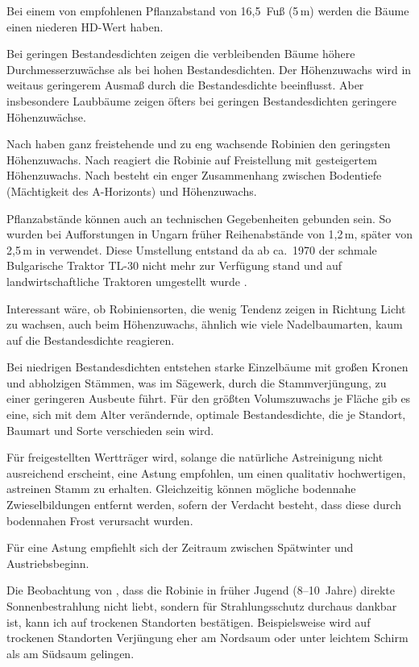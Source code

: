 \documentclass[twocolumn]{scrartcl}
\begin{document}
Bei einem von \cite{jessup1791robinie} empfohlenen Pflanzabstand von
16,5~Fuß (5\,m) werden die Bäume einen niederen HD-Wert haben.

Bei geringen Bestandesdichten zeigen die verbleibenden Bäume höhere
Durchmesserzuwächse als bei hohen Bestandesdichten. Der Höhenzuwachs
wird in weitaus geringerem Ausmaß durch die Bestandesdichte
beeinflusst. Aber insbesondere Laubbäume zeigen öfters bei geringen
Bestandesdichten geringere Höhenzuwächse.

Nach \citet[S.~55]{bluemke1955robinie} haben ganz freistehende und zu
eng wachsende Robinien den geringsten Höhenzuwachs. Nach
\citet[S.~7]{roach1958robinie} reagiert die Robinie auf Freistellung
mit gesteigertem Höhenzuwachs. Nach
\citet{roberts1939robinieHoehenzuwachs} besteht ein enger Zusammenhang
zwischen Bodentiefe (Mächtigkeit des A-Horizonts) und Höhenzuwachs.

Pflanzabstände können auch an technischen Gegebenheiten gebunden sein.
So wurden bei Aufforstungen in Ungarn früher Reihenabstände von
1,2\,m, später von 2,5\,m in verwendet. Diese Umstellung entstand da
ab ca.\ 1970 der schmale Bulgarische Traktor TL-30 nicht mehr zur
Verfügung stand und auf landwirtschaftliche Traktoren umgestellt wurde
\citep{keresztesi1988robinieLw}.

Interessant wäre, ob Robiniensorten, die wenig Tendenz zeigen in
Richtung Licht zu wachsen, auch beim Höhenzuwachs, ähnlich wie viele
Nadelbaumarten, kaum auf die Bestandesdichte reagieren.

Bei niedrigen Bestandesdichten entstehen starke Einzelbäume mit großen
Kronen und abholzigen Stämmen, was im Sägewerk, durch die
Stammverjüngung, zu einer geringeren Ausbeute führt. Für den größten
Volumszuwachs je Fläche gib es eine, sich mit dem Alter verändernde,
optimale Bestandesdichte, die je Standort, Baumart und Sorte
verschieden sein wird.

Für freigestellten Wertträger wird, solange die natürliche
Astreinigung nicht ausreichend erscheint, eine Astung empfohlen, um
einen qualitativ hochwertigen, astreinen Stamm zu erhalten.
Gleichzeitig können mögliche bodennahe Zwieselbildungen entfernt
werden, sofern der Verdacht besteht, dass diese durch bodennahen Frost
verursacht wurden.

Für eine Astung empfiehlt sich der Zeitraum zwischen Spätwinter und
Austriebsbeginn.

Die Beobachtung von \citet[S.~69, 86]{erteld1952robinieErtrag}, dass
die Robinie in früher Jugend (8--10~Jahre) direkte Sonnenbestrahlung
nicht liebt, sondern für Strahlungsschutz durchaus dankbar ist, kann
ich auf trockenen Standorten bestätigen. Beispielsweise wird auf
trockenen Standorten Verjüngung eher am Nordsaum oder unter leichtem
Schirm als am Südsaum gelingen.
\end{document}
